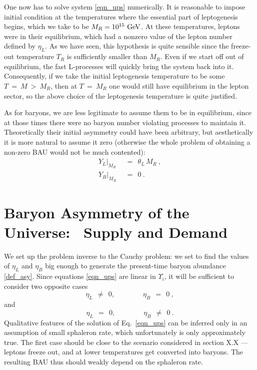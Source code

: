 \documentclass[12pt]{revtex4}
\newcommand{\GeV}{{\rm GeV}}
\begin{document}
	One now has to solve system \eqref{eqn_ups} numerically.
	It is reasonable to impose initial condition at the temperatures
	where the essential part of leptogenesis begins, which we
	take to be $ M_R = 10^{15}~\GeV $.
	At these temperatures, leptons were in their equilibrium, which
	had a nonzero value of the lepton number defined by $ \eta_L $.
	As we have seen, this hypothesis is quite sensible since 
	the freeze-out temperature $ T_R $ is sufficiently smaller than
	$ M_R $.
	Even if we start off out of equilibrium, the fast L-processes
	will quickly bring the system back into it.
	Consequently, if we take the initial leptogenesis temperature
	to be some $ T ~=~ M ~>~ M_R $, then at $ T~=~M_R $ one would
	still have equilibrium in the lepton sector, so the above
	choice of the leptogenesis temperature is quite justified.

	As for baryons, we are less legitimate to assume them to be in
	equilibrium, since at those times there were no baryon number
	violating processes to maintain it.
	Theoretically their initial asymmetry could have been arbitrary,
	but aesthetically it is more natural to assume it zero
	(otherwise the whole problem of obtaining a non-zero BAU would
	not be much contented):
\begin{align*}
	Y_L\bigl|_{M_R} & ~~=~~ \theta_L\, M_R~, \\
	Y_B\bigl|_{M_R} & ~~=~~ 0~.
\end{align*}
		


%
%
\section{Baryon Asymmetry of the Universe: ~Supply and Demand}

	We set up the problem inverse to the Cauchy problem:
	we set to find the values of $ \eta_L $ and $ \eta_B $ 
	big enough to generate the present-time baryon 
	abundance \eqref{def_asy}.
	Since equations \eqref{eqn_ups} are linear in $ \Upsilon_i $,
	it will be sufficient to consider two opposite cases
\[
	\eta_L ~~\neq~~ 0,\qquad\qquad \eta_B ~~=~~ 0~, 
\]
	and
\[
	\eta_L ~~=~~ 0,\qquad\qquad \eta_B ~~\neq~~ 0~.
\]
	Qualitative features of the solution of Eq.~\eqref{eqn_ups} can
	be inferred only in an assumption of small sphaleron rate,
	which unfortunately is only approximately true.
	The first case should be close to the scenario considered in
	section X.X --- 
	leptons freeze out, and at lower temperatures get converted
	into baryons. 
	The resulting BAU thus should weakly depend on the sphaleron
	rate.
\end{document}
